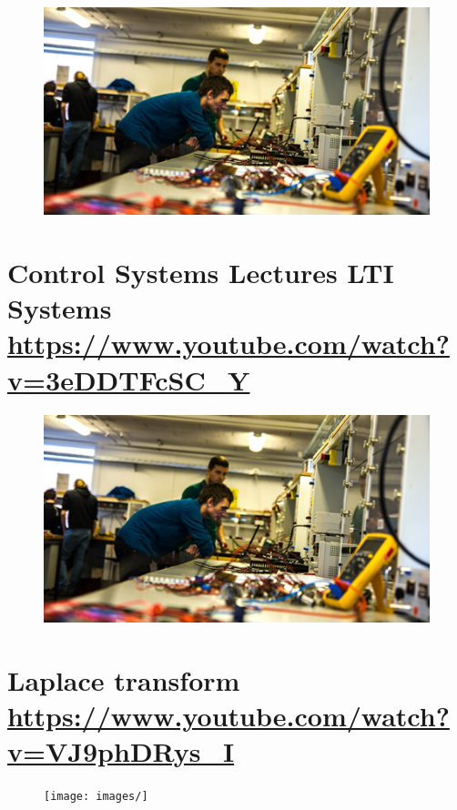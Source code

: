 \documentclass[
	12pt, %
]{fphw}
\begin{document}
\begin{figure}[H]
  \centering
  \includegraphics[scale=0.3]{images/control_ing.jpg}
\end{figure}

\newpage
\section*{{\color{RoyalPurple}Control Systems Lectures LTI Systems} \url{https://www.youtube.com/watch?v=3eDDTFcSC_Y}}

\begin{figure}[H]
  \centering
  \includegraphics[scale=0.3]{images/control_ing.jpg}
\end{figure}

\newpage
\section*{{\color{RoyalPurple}Laplace transform} \url{https://www.youtube.com/watch?v=VJ9phDRys_I}}

\begin{figure}[H]
  \centering
  \texttt{[image: images/]}
\end{figure}
\end{document}
